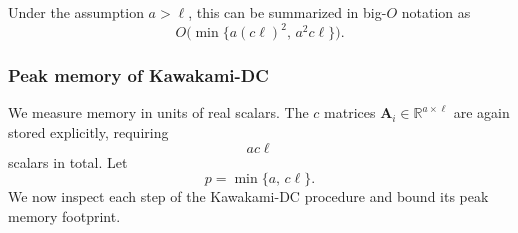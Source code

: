 \documentclass[final,3p,times]{elsarticle}
\theoremstyle{plain}
\newcommand{\matr}[1]{\bm{#1}}        %
\begin{document}
Under the assumption $a > \ell$, this can be summarized in big-$O$ notation as
\begin{equation}
    O\bigl(\min\{a(c\ell)^{2},\, a^{2}c\ell\}\bigr).
\end{equation}


\subsubsection{Peak memory of Kawakami-DC}
\label{subsubsec: Kawakami memory}

We measure memory in units of real scalars. The $c$ matrices $\matr{A}_{i}\in \mathbb{R}^{a\times \ell}$ are again stored explicitly, requiring
\begin{equation}
  a c \ell
\end{equation}
scalars in total. Let
\begin{equation}
  p = \min\{a,\, c\ell\}.
\end{equation}
We now inspect each step of the Kawakami-DC procedure and bound its peak memory footprint.
\end{document}
